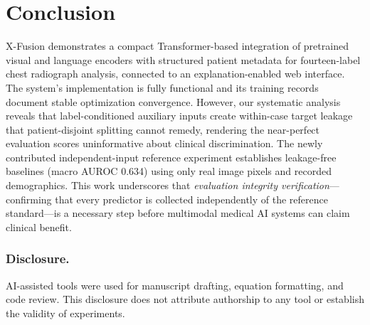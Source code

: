 \documentclass[runningheads,a4paper]{llncs}
\begin{document}
\section{Conclusion}

X-Fusion demonstrates a compact Transformer-based integration of pretrained visual and language encoders with structured patient metadata for fourteen-label chest radiograph analysis, connected to an explanation-enabled web interface.
The system's implementation is fully functional and its training records document stable optimization convergence.
However, our systematic analysis reveals that label-conditioned auxiliary inputs create within-case target leakage that patient-disjoint splitting cannot remedy, rendering the near-perfect evaluation scores uninformative about clinical discrimination.
The newly contributed independent-input reference experiment establishes leakage-free baselines (macro AUROC 0.634) using only real image pixels and recorded demographics.
This work underscores that \emph{evaluation integrity verification}---confirming that every predictor is collected independently of the reference standard---is a necessary step before multimodal medical AI systems can claim clinical benefit.

\subsubsection{Disclosure.}
AI-assisted tools were used for manuscript drafting, equation formatting, and code review.
This disclosure does not attribute authorship to any tool or establish the validity of experiments.



\end{document}

